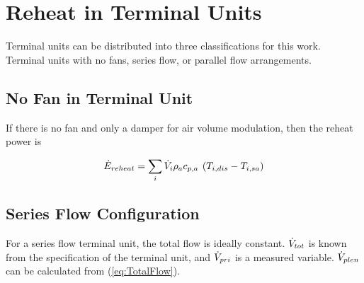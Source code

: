 
\section{Reheat in Terminal Units}

Terminal units can be distributed into three classifications for this work.
Terminal units with no fans, series flow, or parallel flow arrangements.

\subsection{No Fan in Terminal Unit}

If there is no fan and only a damper for air volume modulation, then the reheat
power is

\begin{equation} \label{eq:ReheatEnergy}
    {\dot E_{reheat}} = \sum\limits_i {{\dot{V}_{i}}\rho_a c_{p,a}\:\left( {{T_{i,dis}} - {T_{i,sa}}} \right)}
\end{equation}

\subsection{Series Flow Configuration}

For a series flow terminal unit, the total flow is ideally constant.
\(\dot{V}_{tot}\) is known from the specification of the terminal unit, and
\(\dot{V}_{pri}\) is a measured variable. \(\dot{V}_{plen}\) can be calculated from
 (\ref{eq:TotalFlow}).


